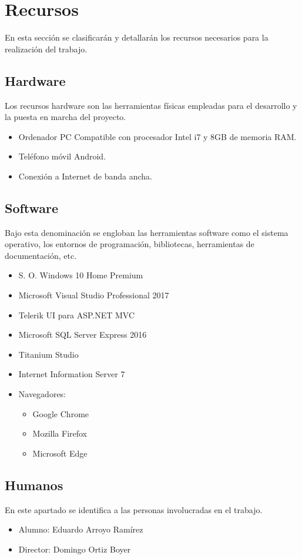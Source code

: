 \section{Recursos}
En esta sección se clasificarán y detallarán los recursos necesarios para la realización del trabajo.

\subsection{Hardware}
Los recursos hardware son las herramientas físicas empleadas para el desarrollo y la puesta en marcha del proyecto.
\begin{itemize}
    \item Ordenador PC Compatible con procesador Intel i7 y 8GB de memoria RAM.
    \item Teléfono móvil Android.
    \item Conexión a Internet de banda ancha.
\end{itemize}

\subsection{Software}
Bajo esta denominación se engloban las herramientas software como el sistema operativo, los entornos de programación, bibliotecas, herramientas de documentación, etc.
\begin{itemize}
    \item S. O. Windows 10 Home Premium
    \item Microsoft Visual Studio Professional 2017
    \item Telerik UI para ASP.NET MVC
    \item Microsoft SQL Server Express 2016
    \item Titanium Studio
    \item Internet Information Server 7
    \item Navegadores:
        \begin{itemize}
            \item Google Chrome
            \item Mozilla Firefox
            \item Microsoft Edge
        \end{itemize}
\end{itemize}

\subsection{Humanos}
En este apartado se identifica a las personas involucradas en el trabajo.
\begin{itemize}
    \item Alumno: Eduardo Arroyo Ramírez
    \item Director: Domingo Ortiz Boyer
\end{itemize}